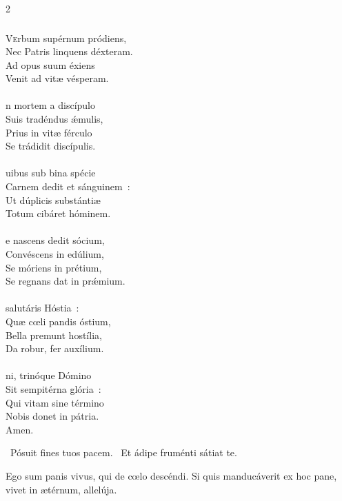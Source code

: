 \documentclass[9pt,twoside]{extarticle}
\begin{document}
\begin{multicols}{2}
{{\subsubsection*{\center {}}
\begin{center}\end{center}
\lettrine{V}erbum supérnum pródiens,\\
Nec Patris linquens déxteram.\\
Ad opus suum éxiens\\
Venit ad vitæ vésperam.\\
\\
n mortem a discípulo\\
Suis tradéndus ǽmulis,\\
Prius in vitæ férculo\\
Se trádidit discípulis.\\
\\
uibus sub bina spécie\\
Carnem dedit et sánguinem~:\\
Ut dúplicis substántiæ\\
Totum cibáret hóminem.\\
\\
e nascens dedit sócium,\\
Convéscens in edúlium,\\
Se móriens in prétium,\\
Se regnans dat in prǽmium.\\
\\
 salutáris Hóstia~:\\
Quæ cœli pandis óstium,\\
Bella premunt hostília,\\
Da robur, fer auxílium.\\
\\
ni, trinóque Dómino\\
Sit sempitérna glória~:\\
Qui vitam sine término\\
Nobis donet in pátria.\\
Amen.

\begin{tightlist}{}
\item {}~Pósuit fines tuos pacem. ~Et ádipe fruménti sátiat te.
\item {} Ego sum panis vivus, qui de cœlo descéndi. Si quis manducáverit ex hoc pane, vivet in ætérnum, allelúja. 
\end{tightlist}

}}
\end{multicols}
\end{document}
